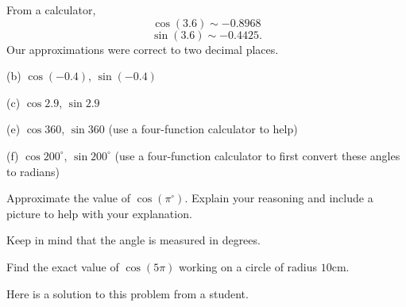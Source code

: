 \documentclass{ximera}
\begin{document}
\begin{question}
\begin{explanation}
From a calculator,
\[
   \cos (3.6) \sim -0.8968
\]
\[
    \sin(3.6) \sim -0.4425 .
\]
Our approximations were correct to two decimal places.

\end{explanation}

(b) $\cos (-0.4)$,  $\sin (-0.4)$ %

(c) $\cos 2.9$, $\sin 2.9$ %


(e) $\cos 360$, $\sin 360$ (use a four-function calculator to help)

(f) $\cos 200^\circ$, $\sin 200^\circ$ (use a four-function calculator to first convert these angles to radians)

 
 

\end{question}

\begin{question} \label{Q2:Cosine}
Approximate the value of $\cos (\pi^\circ)$. Explain your reasoning and include a picture to help with your explanation.
\begin{hint}
Keep in mind that the angle is measured in degrees.
\end{hint}
\end{question}



\begin{example}  \label{Exsfs4hkj:Cosine}
Find the exact value of $\cos (5\pi)$ working on a circle of radius $10$cm.

\begin{explanation}

Here is a solution to this problem from a student.

 
\begin{onlineOnly}
    \begin{center}
\end{center}
\end{onlineOnly}

\end{explanation}

\end{example}
\end{document}
